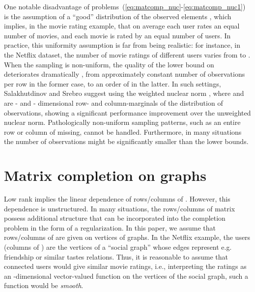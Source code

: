 \documentclass{article}
\begin{document}
One notable disadvantage of problems~(\ref{eq:matcomp_nuc}-\ref{eq:matcomp_nuc1}) is the assumption of a ``good'' distribution of the observed elements , which implies, in the movie rating example, that on average each user rates an equal number of movies, and each movie is rated by an equal number of users. In practice, this uniformity assumption is far from being realistic: for instance, in the Netflix dataset, the number of movie ratings of different users varies from  to . When the sampling is non-uniform, the quality of the lower bound on  deteriorates dramatically \cite{salakhutdinov2010collaborative}, from approximately constant number of observations per row in the former case, to an order of  in the latter. In such settings, Salakhutdinov and Srebro \cite{salakhutdinov2010collaborative} suggest using the weighted nuclear norm , where  and  are - and - dimensional row- and column-marginals of the distribution of observations, showing a significant performance improvement over the unweighted nuclear norm. Pathologically non-uniform sampling patterns, such as an entire row or column of  missing, cannot be handled. Furthermore, in many situations the number of observations might be significantly smaller than the lower bounds. 



















\vspace{-0.1cm}
\section{Matrix completion on graphs}
\label{secMatComOnGrap}
\vspace{-0.2cm}


Low rank implies the linear dependence of rows/columns of . However, this dependence is unstructured. In many situations, the rows/columns of matrix  possess additional structure that can be incorporated into the completion problem in the form of a regularization. In this paper, we assume that rows/columns of  are given on vertices of graphs. In the Netflix example, the users (columns of ) are the vertices of a ``social graph'' whose edges represent e.g. friendship or similar tastes  relations. Thus, it is reasonable to assume that connected users would give similar movie ratings, i.e., interpreting the ratings as an -dimensional vector-valued function on the  vertices of the social graph, such a function would be {\em smooth}.
\end{document}
